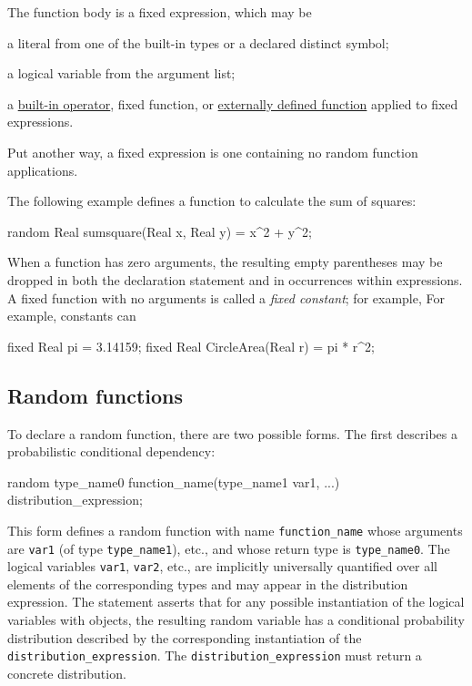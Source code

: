 \documentclass[12pt]{article}
\begin{document}
The function body is a fixed expression, which may be
\begin{itemize*}
\item a literal from one of the built-in types or a declared distinct symbol;
\item a logical variable from the argument list;
\item a \hyperref[builtin-operator-appendix]{built-in operator}, fixed function, or \hyperref[external-function-appendix]{externally defined function} applied to fixed expressions.
\end{itemize*}
Put another way, a fixed expression is one containing no random function applications.

The following example defines a function to calculate the sum of squares:
\begin{blogcode}
random Real sumsquare(Real x, Real y) = x^2 + y^2;
\end{blogcode}

When a function has zero arguments, the resulting empty parentheses may be dropped
in both the declaration statement and in occurrences within expressions.
A fixed function with no arguments is called a \emph{fixed constant}; for example,
For example, constants can 
\begin{blogcode}
fixed Real pi = 3.14159;
fixed Real CircleArea(Real r) = pi * r^2;
\end{blogcode}



\subsection{Random functions}\label{random-function-section}

To declare a random function, there are two possible forms. The first describes a probabilistic
conditional dependency:
\begin{blogcode}
random type_name0 function_name(type_name1 var1, ...) ~ 
  distribution_expression;
\end{blogcode}
This form defines a random function with name \texttt{function\_name} whose arguments are {\tt var1} (of type \verb|type_name1|), etc.,
and whose return type is \verb|type_name0|. The logical variables {\tt var1}, {\tt var2}, etc., are implicitly universally quantified over
all elements of the corresponding types and may appear in the distribution expression. The statement asserts that for any possible instantiation of the
logical variables with objects, the resulting random variable has a conditional probability distribution
described by the corresponding instantiation of the {\tt distribution\_expression}. The {\tt distribution\_expression} must return a concrete distribution. 
\end{document}
